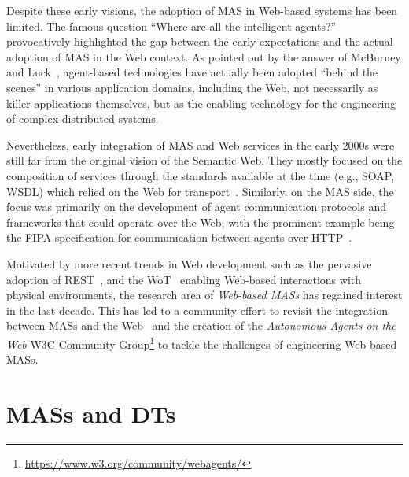 Despite these early visions, the adoption of \ac{MAS} in Web-based systems has been limited.
%
The famous question ``Where are all the intelligent agents?''~\cite{Hendler_2007} provocatively highlighted the gap between the early expectations and the actual adoption of \ac{MAS} in the Web context.
%
As pointed out by the answer of McBurney and Luck~\cite{McBurney_Luck_2007}, agent-based technologies have actually been adopted ``behind the scenes'' in various application domains, including the Web, not necessarily as killer applications themselves, but as the enabling technology for the engineering of complex distributed systems.

Nevertheless, early integration of \ac{MAS} and Web services in the early 2000s were still far from the original vision of the Semantic Web.
%
They mostly focused on the composition of services through the standards available at the time (e.g., SOAP, WSDL) which relied on the Web for transport~\cite{Newcomer_2002}.
%
Similarly, on the \ac{MAS} side, the focus was primarily on the development of agent communication protocols and frameworks that could operate over the Web, with the prominent example being the \ac{FIPA} specification for communication between agents over \ac{HTTP}~\cite{fipa2002http}.

Motivated by more recent trends in Web development such as the pervasive adoption of \ac{REST}~\cite{fielding2000architectural}, and the \ac{WoT}~\cite{Guinard_Trifa_2016_book} enabling Web-based interactions with physical environments, the research area of \emph{Web-based \acp{MAS}} has regained interest in the last decade.
%
This has led to a community effort to revisit the integration between \acp{MAS} and the Web~\cite{Boissier_Ciortea_Harth_Ricci_2021,Boissier_Ciortea_Harth_Ricci_Vachtsevanou_2023} and the creation of the \emph{Autonomous Agents on the Web} \ac{W3C} Community Group\footnote{\url{https://www.w3.org/community/webagents/}} to tackle the challenges of engineering Web-based \acp{MAS}. 





\section{\aclp{MAS} and \aclp{DT}}

